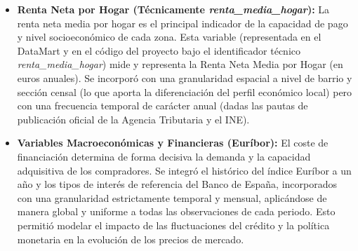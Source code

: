 \documentclass[a4paper,11pt,openany]{book}
\begin{document}
\begin{itemize}
    \item \textbf{Renta Neta por Hogar (Técnicamente \textit{renta\_media\_hogar}):} La renta neta media por hogar es el principal indicador de la capacidad de pago y nivel socioeconómico de cada zona. Esta variable (representada en el DataMart y en el código del proyecto bajo el identificador técnico \textit{renta\_media\_hogar}) mide y representa la Renta Neta Media por Hogar (en euros anuales). Se incorporó con una granularidad espacial a nivel de barrio y sección censal (lo que aporta la diferenciación del perfil económico local) pero con una frecuencia temporal de carácter anual (dadas las pautas de publicación oficial de la Agencia Tributaria y el INE).
    
    \begin{table}[H]
    \hspace*{0.6cm}
    \renewcommand{\arraystretch}{1.5}
    \caption{Fuentes de datos oficiales para el nivel de renta media.}
    \label{tab:fuente_renta}
    \end{table}

    \item \textbf{Variables Macroeconómicas y Financieras (Euríbor):} El coste de financiación determina de forma decisiva la demanda y la capacidad adquisitiva de los compradores. Se integró el histórico del índice Euríbor a un año y los tipos de interés de referencia del Banco de España, incorporados con una granularidad estrictamente temporal y mensual, aplicándose de manera global y uniforme a todas las observaciones de cada periodo. Esto permitió modelar el impacto de las fluctuaciones del crédito y la política monetaria en la evolución de los precios de mercado.
    
    \begin{table}[H]
    \hspace*{0.6cm}
    \renewcommand{\arraystretch}{1.5}
    \caption{Fuentes de datos oficiales para los indicadores financieros.}
    \label{tab:fuente_macro}
    \end{table}
\end{itemize}
\end{document}
